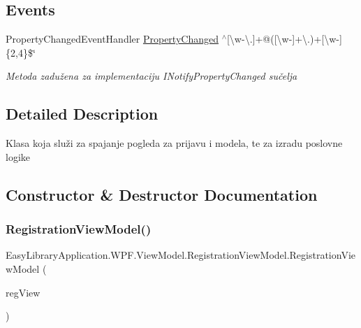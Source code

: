 \subsection*{Events}
\begin{DoxyCompactItemize}
\item 
Property\+Changed\+Event\+Handler \mbox{\hyperlink{class_easy_library_application_1_1_w_p_f_1_1_view_model_1_1_registration_view_model_ae88942054c90a4f0f9a66c39166d11e6}{Property\+Changed}} $^\wedge$\mbox{[}\textbackslash{}w-\/\textbackslash{}.\mbox{]}+@(\mbox{[}\textbackslash{}w-\/\mbox{]}+\textbackslash{}.)+\mbox{[}\textbackslash{}w-\/\mbox{]}\{2,4\}\$\char`\"{}
\begin{DoxyCompactList}\small\item\em Metoda zadužena za implementaciju I\+Notify\+Property\+Changed sučelja \end{DoxyCompactList}\end{DoxyCompactItemize}


\subsection{Detailed Description}
Klasa koja služi za spajanje pogleda za prijavu i modela, te za izradu poslovne logike 



\subsection{Constructor \& Destructor Documentation}
\mbox{\label{class_easy_library_application_1_1_w_p_f_1_1_view_model_1_1_registration_view_model_a7d12725646bc65a39ff67459a8579217}} 
\subsubsection{\texorpdfstring{Registration\+View\+Model()}{RegistrationViewModel()}}
{\footnotesize\ttfamily Easy\+Library\+Application.\+W\+P\+F.\+View\+Model.\+Registration\+View\+Model.\+Registration\+View\+Model (\begin{DoxyParamCaption}\item[{\mbox{\hyperlink{class_easy_library_application_1_1_w_p_f_1_1_view_1_1_registration_view}{Registration\+View}}}]{reg\+View }\end{DoxyParamCaption})}



